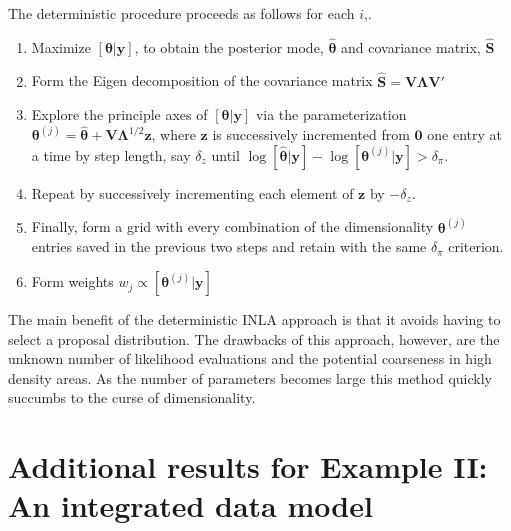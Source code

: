 \documentclass[12pt]{article}
\newcommand{\by}{\mathbf{y}}
\newcommand{\bt}{\boldsymbol{\theta}}
\newcommand{\bS}{\mathbf{S}}
\begin{document}
The deterministic procedure proceeds as follows for each $i$,.
\begin{enumerate}
\item Maximize $[\bt|\by]$, to obtain the posterior mode, $\hat{\bt}$ and covariance matrix, $\hat{\bS}$
\item Form the Eigen decomposition of the covariance matrix $\hat{\bS} = \mathbf{V}\boldsymbol{\Lambda}\mathbf{V}'$
\item Explore the principle axes of $[\bt|\by]$ via the parameterization $\bt^{(j)} = \hat{\bt} + \mathbf{V}\boldsymbol{\Lambda}^{1/2}\mathbf{z}$, where $\mathbf{z}$ is successively incremented from $\mathbf{0}$ one entry at a time by step length, say $\delta_z$ until $\log[\hat{\bt}|\by]-\log[\bt^{(j)}|\by] > \delta_\pi$.
\item Repeat by successively incrementing each element of $\mathbf{z}$ by $-\delta_z$.
\item Finally, form a grid with every combination of the dimensionality $\bt^{(j)}$ entries saved in the previous two steps and retain with the same $\delta_\pi$ criterion.
\item Form weights $w_j \propto [\bt^{(j)}|\by]$
\end{enumerate}
The main benefit of the deterministic INLA approach is that it avoids having to select a proposal distribution. The drawbacks of this approach, however, are the unknown number of likelihood evaluations and the potential coarseness in high density areas. As the number of parameters becomes large this method quickly succumbs to the curse of dimensionality.
\clearpage 

\section{Additional results for Example II: An integrated data model}
\label{sec:ipm.results}
\end{document}
